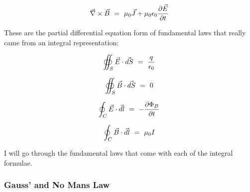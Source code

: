 \documentclass{article}
\begin{document}
\begin{equation} \label{eq:4}
\vec{\nabla} \times \vec{B} \hspace{0.125cm} = \hspace{0.125cm} \mu_0\vec{J} +  \mu_0\epsilon_0\frac{\partial{\vec{E}}}{\partial{t}}
\end{equation}

These are the partial differential equation form of fundamental laws that really came from an integral representation:

\begin{equation} \label{eq:5}
\oiint_S \vec{E}\cdot\vec{dS} \hspace{0.125cm} = \hspace{0.125cm} \frac{q}{\epsilon_0}
\end{equation}

\begin{equation} \label{eq:6}
\oiint_S \vec{B}\cdot\vec{dS} \hspace{0.125cm} = \hspace{0.125cm} 0
\end{equation}

\begin{equation} \label{eq:7}
\oint_C \vec{E}\cdot\vec{dl} \hspace{0.125cm} = \hspace{0.125cm} -\frac{\partial{\Phi_B}}{\partial{t}}
\end{equation}

\begin{equation} \label{eq:8}
\oint_C \vec{B}\cdot\vec{dl} \hspace{0.125cm} = \hspace{0.125cm} \mu_0I
\end{equation}

I will go through the fundamental laws that come with each of the integral formulae. 




\subsubsection{Gauss' and No Mans Law}
\end{document}
